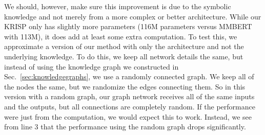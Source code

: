 \documentclass[final]{cvpr}
\providecommand{\ModelName}{KRISP\xspace}
\providecommand{\MMBERTAbr}{MMBERT\xspace}
\begin{document}
We should, however, make sure this improvement is due to the symbolic knowledge and not merely from a more complex or better architecture. While our \ModelName only has slightly more parameters (116M parameters versus \MMBERTAbr with 113M), it does add at least some extra computation. To test this, we approximate a version of our method with only  the architecture and not the underlying knowledge. To do this, we keep all network details the same, but instead of using the knowledge graph we constructed in Sec.~\ref{sec:knowledgegraphs}, we use a randomly connected graph. We keep all of the nodes the same, but we randomize the edges connecting them. So in this version with a random graph, our graph network receives all of the same inputs and the outputs, but all connections are completely random. If the performance were just from the computation, we would expect this to work. 
Instead, we see from line 3 that the performance using the random graph drops significantly.
\end{document}

